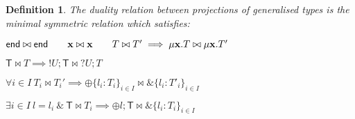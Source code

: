\documentclass{LMCS}
\newcommand{\kf}[1]{\textup{\textsf{#1}}\xspace}
\newcommand{\T}{\ensuremath{T}}
\newcommand{\TG}{\ensuremath{{\mathsf{T}}}}
\newcommand{\UT}{\ensuremath{U}}
\newcommand{\End}{\kf{end}}
\newcommand{\seltypeTp}{\ensuremath{\oplus\{l_i:\T_i\}_{i\in I}}}
\newcommand{\branchtypeTp}{\ensuremath{\&\{l_i:\T'_i\}_{i\in I}}}
\newcommand{\branchtypes}{\ensuremath{\&\{l_i:\T_i\}_{i\in I}}}
\newcommand{\dual}[2]{\ensuremath{{#1}\bowtie{#2}}}
\newcommand{\xx}{\ensuremath{\mathbf{x}}}
\newtheorem{DEFINITION}[DUM]{Definition}{}{}
\begin{document}
\begin{DEFINITION}\label{dd}
The {\em duality relation} between projections of generalised
types is the minimal symmetric relation which satisfies:

\begin{center}
$\dual\End\End\qquad \dual\xx\xx\qquad \dual\T{\T'}\implies
\dual{\mu \xx.\T}{\mu \xx.\T'}$ 

$\dual\TG{\T}\implies\dual{!\UT;\TG}{?\UT;\T}$

$\forall i\in I ~\dual{\T_i}{\T_i'}\implies \dual \seltypeTp
\branchtypeTp $

$\exists i\in I ~l=l_i~\&~\dual{\TG}{\T_i}\implies \dual {\oplus
l;\TG} \branchtypes $

\end{center}
\end{DEFINITION}
\end{document}
